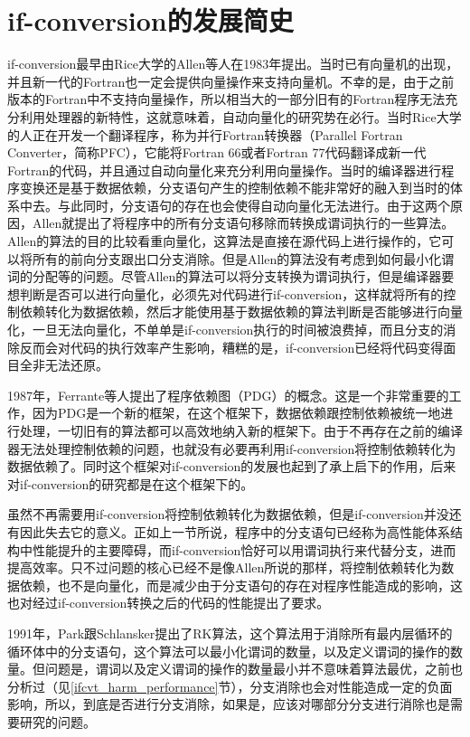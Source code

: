 \section{if-conversion的发展简史}

if-conversion最早由Rice大学的Allen等人在1983年提出\cite{allen1983Concondeptodatdep}。当时已有向量机的出现，并且新一代的Fortran也一定会提供向量操作来支持向量机。不幸的是，由于之前版本的Fortran中不支持向量操作，所以相当大的一部分旧有的Fortran程序无法充分利用处理器的新特性，这就意味着，自动向量化的研究势在必行。当时Rice大学的人正在开发一个翻译程序，称为并行Fortran转换器（Parallel Fortran Converter，简称PFC），它能将Fortran 66或者Fortran 77代码翻译成新一代Fortran的代码，并且通过自动向量化来充分利用向量操作。当时的编译器进行程序变换还是基于数据依赖，分支语句产生的控制依赖不能非常好的融入到当时的体系中去。与此同时，分支语句的存在也会使得自动向量化无法进行。由于这两个原因，Allen就提出了将程序中的所有分支语句移除而转换成谓词执行的一些算法。Allen的算法的目的比较看重向量化，这算法是直接在源代码上进行操作的，它可以将所有的前向分支跟出口分支消除。但是Allen的算法没有考虑到如何最小化谓词的分配等的问题。尽管Allen的算法可以将分支转换为谓词执行，但是编译器要想判断是否可以进行向量化，必须先对代码进行if-conversion，这样就将所有的控制依赖转化为数据依赖，然后才能使用基于数据依赖的算法判断是否能够进行向量化，一旦无法向量化，不单单是if-conversion执行的时间被浪费掉，而且分支的消除反而会对代码的执行效率产生影响，糟糕的是，if-conversion已经将代码变得面目全非无法还原。

1987年，Ferrante等人提出了程序依赖图（PDG）的概念\cite{ferrante1987prodepgraitsuseopt}。这是一个非常重要的工作，因为PDG是一个新的框架，在这个框架下，数据依赖跟控制依赖被统一地进行处理，一切旧有的算法都可以高效地纳入新的框架下。由于不再存在之前的编译器无法处理控制依赖的问题，也就没有必要再利用if-conversion将控制依赖转化为数据依赖了。同时这个框架对if-conversion的发展也起到了承上启下的作用，后来对if-conversion的研究都是在这个框架下的。

虽然不再需要用if-conversion将控制依赖转化为数据依赖，但是if-conversion并没还有因此失去它的意义。正如上一节所说，程序中的分支语句已经称为高性能体系结构中性能提升的主要障碍，而if-conversion恰好可以用谓词执行来代替分支，进而提高效率。只不过问题的核心已经不是像Allen所说的那样，将控制依赖转化为数据依赖，也不是向量化，而是减少由于分支语句的存在对程序性能造成的影响，这也对经过if-conversion转换之后的代码的性能提出了要求。

1991年，Park跟Schlansker提出了RK算法\cite{JosephC.H.Park1991}，这个算法用于消除所有最内层循环的循环体中的分支语句，这个算法可以最小化谓词的数量，以及定义谓词的操作的数量。但问题是，谓词以及定义谓词的操作的数量最小并不意味着算法最优，之前也分析过（见\ref{ifcvt_harm_performance}节），分支消除也会对性能造成一定的负面影响，所以，到底是否进行分支消除，如果是，应该对哪部分分支进行消除也是需要研究的问题。

